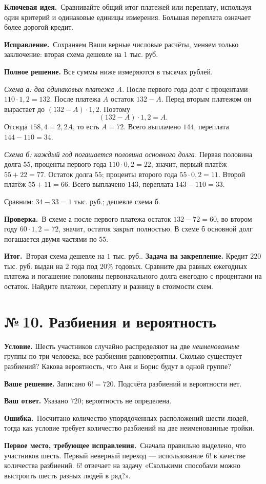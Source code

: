\documentclass[a4paper,12pt]{article}
\newcommand{\errlabel}{\textcolor{err}{\textbf{Ошибка.}}}
\newcommand{\keylabel}{\textcolor{accent}{\textbf{Ключевая идея.}}}
\newcommand{\resultlabel}{\textcolor{accent}{\textbf{Итог.}}}
\newcommand{\reviewtask}[2]{\clearpage\phantomsection\label{task:#1}\section*{\textcolor{accent}{№\,#1. #2}}}
\newcommand{\firstwrong}{\textbf{Первое место, требующее исправления.}}
\newcommand{\fix}{\textbf{Исправление.}}
\newcommand{\verify}{\textbf{Проверка.}}
\newcommand{\practice}{\medskip\textbf{Задача на закрепление.} }
\begin{document}
\keylabel\ Сравнивайте общий итог платежей или переплату, используя один критерий и одинаковые единицы измерения. Большая переплата означает более дорогой кредит.

\fix\ Сохраняем Ваши верные числовые расчёты, меняем только заключение: вторая схема дешевле на $1$ тыс. руб.

\textbf{Полное решение.} Все суммы ниже измеряются в тысячах рублей.

\emph{Схема а: два одинаковых платежа $A$.} После первого года долг с процентами $110\cdot1{,}2=132$. После платежа $A$ остаток $132-A$. Перед вторым платежом он вырастает до $(132-A)\cdot1{,}2$. Поэтому
\[
(132-A)\cdot1{,}2=A.
\]
Отсюда $158{,}4=2{,}2A$, то есть $A=72$. Всего выплачено $144$, переплата $144-110=34$.

\emph{Схема б: каждый год погашается половина основного долга.} Первая половина долга $55$, проценты первого года $110\cdot0{,}2=22$, значит, первый платёж $55+22=77$. Остаток долга $55$; проценты второго года $55\cdot0{,}2=11$. Второй платёж $55+11=66$. Всего выплачено $143$, переплата $143-110=33$.

Сравним: $34-33=1$ тыс. руб.; дешевле схема б.

\verify\ В схеме а после первого платежа остаток $132-72=60$, во втором году $60\cdot1{,}2=72$, значит, остаток закрыт полностью. В схеме б основной долг погашается двумя частями по $55$.

\resultlabel\ $\boxed{\text{Вторая схема дешевле на }1\text{ тыс. руб.}}$.
\practice Кредит $220$ тыс. руб. выдан на $2$ года под $20\%$ годовых. Сравните два равных ежегодных платежа и погашение половины первоначального долга ежегодно с процентами на остаток. Найдите платежи, переплату и разницу в стоимости схем.

\reviewtask{10}{Разбиения и вероятность}
\textbf{Условие.} Шесть участников случайно распределяют на две \emph{неименованные} группы по три человека; все разбиения равновероятны. Сколько существует разбиений? Какова вероятность, что Аня и Борис будут в одной группе?

\textbf{Ваше решение.} Записано $6!=720$. Подсчёта разбиений и вероятности нет.

\textbf{Ваш ответ.} Указано $720$; вероятность не определена.

\errlabel\ Посчитано количество упорядоченных расположений шести людей, тогда как условие требует количество разбиений на две неименованные тройки.

\firstwrong\ Сначала правильно выделено, что участников шесть. Первый неверный переход --- использование $6!$ в качестве количества разбиений. $6!$ отвечает на задачу «Сколькими способами можно выстроить шесть разных людей в ряд?».
\end{document}

